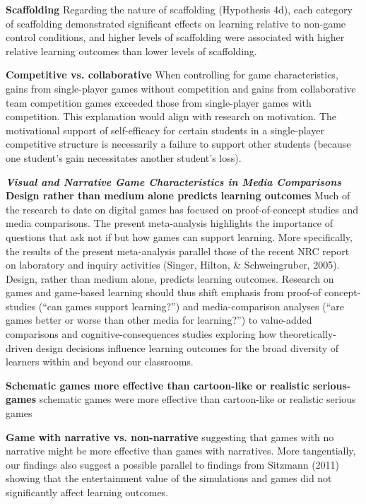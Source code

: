 \textbf{Scaffolding}
Regarding the nature of scaffolding (Hypothesis 4d), each category of scaffolding demonstrated significant effects on learning relative to non-game control conditions, and higher levels of scaffolding were associated with higher relative learning outcomes than lower levels of scaffolding.

\textbf{Competitive vs. collaborative}
When controlling for game characteristics, gains from single-player games without competition and gains from collaborative team competition games exceeded those from single-player games with competition. This explanation would align with research on motivation. The motivational support of self-efficacy for certain students in a single-player competitive structure is necessarily a failure to support other students (because one student’s gain necessitates another student’s loss).

\textbf{\textit{Visual and Narrative Game Characteristics in Media Comparisons}}
\textbf{Design rather than medium alone predicts learning outcomes}
Much of the research to date on digital games has focused on proof-of-concept studies and media comparisons. The present meta-analysis highlights the importance of questions that ask not if but how games can support learning. More specifically, the results of the present meta-analysis parallel those of the recent NRC report on laboratory and inquiry activities (Singer, Hilton, \& Schweingruber, 2005). Design, rather than medium alone, predicts learning outcomes. Research on games and game-based learning should thus shift emphasis from proof-of concept-studies (“can games support learning?”) and media-comparison analyses (“are games better or worse than other media for learning?”) to value-added comparisons and cognitive-consequences studies exploring how theoretically-driven design decisions influence learning outcomes for the broad diversity of learners within and beyond our classrooms.

\textbf{Schematic games more effective than cartoon-like or realistic serious-games}
schematic games were more effective than cartoon-like or realistic serious games

\textbf{Game with narrative vs. non-narrative}
suggesting that games with no narrative might be more effective than games with narratives. More tangentially, our findings also suggest a possible parallel to findings from Sitzmann (2011) showing that the entertainment value of the simulations and games did not significantly affect learning outcomes.